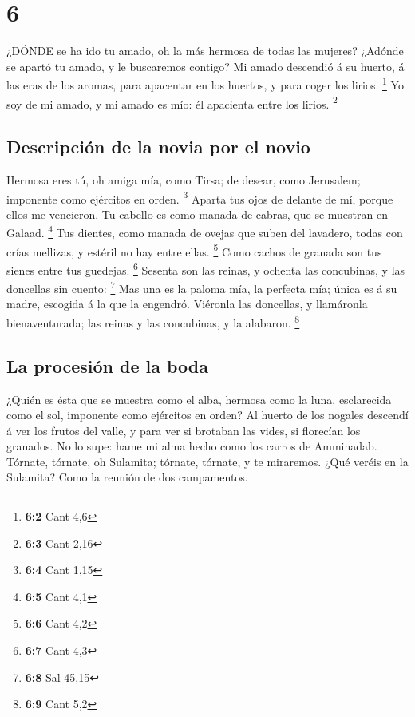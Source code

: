 \hypertarget{section-5}{%
\section{6}\label{section-5}}

 ¿DÓNDE se ha ido tu amado, oh la más hermosa de todas las
mujeres? ¿Adónde se apartó tu amado, y le buscaremos contigo?
 Mi amado descendió á su huerto, á las eras de los aromas,
para apacentar en los huertos, y para coger los lirios. \footnote{\textbf{6:2}
  Cant 4,6}  Yo soy de mi amado, y mi amado es mío: él
apacienta entre los lirios. \footnote{\textbf{6:3} Cant 2,16}

\hypertarget{descripciuxf3n-de-la-novia-por-el-novio-1}{%
\subsection{Descripción de la novia por el
novio}\label{descripciuxf3n-de-la-novia-por-el-novio-1}}

 Hermosa eres tú, oh amiga mía, como Tirsa; de desear, como
Jerusalem; imponente como ejércitos en orden. \footnote{\textbf{6:4}
  Cant 1,15}  Aparta tus ojos de delante de mí, porque ellos
me vencieron. Tu cabello es como manada de cabras, que se muestran en
Galaad. \footnote{\textbf{6:5} Cant 4,1}  Tus dientes, como
manada de ovejas que suben del lavadero, todas con crías mellizas, y
estéril no hay entre ellas. \footnote{\textbf{6:6} Cant 4,2}
 Como cachos de granada son tus sienes entre tus guedejas.
\footnote{\textbf{6:7} Cant 4,3}  Sesenta son las reinas, y
ochenta las concubinas, y las doncellas sin cuento: \footnote{\textbf{6:8}
  Sal 45,15}  Mas una es la paloma mía, la perfecta mía;
única es á su madre, escogida á la que la engendró. Viéronla las
doncellas, y llamáronla bienaventurada; las reinas y las concubinas, y
la alabaron. \footnote{\textbf{6:9} Cant 5,2}

\hypertarget{la-procesiuxf3n-de-la-boda}{%
\subsection{La procesión de la boda}\label{la-procesiuxf3n-de-la-boda}}

 ¿Quién es ésta que se muestra como el alba, hermosa como
la luna, esclarecida como el sol, imponente como ejércitos en orden?
 Al huerto de los nogales descendí á ver los frutos del
valle, y para ver si brotaban las vides, si florecían los granados.
 No lo supe: hame mi alma hecho como los carros de
Amminadab.  Tórnate, tórnate, oh Sulamita; tórnate,
tórnate, y te miraremos. ¿Qué veréis en la Sulamita? Como la reunión de
dos campamentos.


